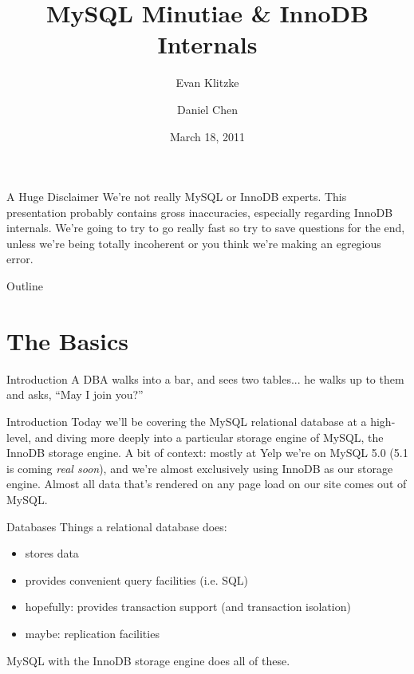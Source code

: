 \documentclass[14pt]{beamer}
\title{MySQL Minutiae \& InnoDB Internals}
\author{Evan Klitzke \and Daniel Chen}
\institute{Yelp, Inc.}
\date{March 18, 2011}
\newcommand{\myitem}{\item[\textbullet]}
\begin{document}
\begin{frame}
  \titlepage
\end{frame}

\begin{frame}{A Huge Disclaimer}
  We're not really MySQL or InnoDB experts.
  \newline
  \newline
  This presentation probably contains gross inaccuracies, especially regarding
  InnoDB internals.
  \newline
  \newline
  We're going to try to go really fast so try to save questions for the end,
  unless we're being totally incoherent or you think we're making an egregious
  error.
\end {frame}

\begin{frame}{Outline}
  \tableofcontents
\end{frame}

\section{The Basics}

\begin{frame}{Introduction}
  A DBA walks into a bar, and sees two tables...
  \pause
  \newline
  he walks up to them and asks, ``May I join you?''
\end {frame}

\begin{frame}{Introduction}
  Today we'll be covering the MySQL relational database at a high-level, and
  diving more deeply into a particular storage engine of MySQL, the InnoDB
  storage engine.
  \newline
  \newline
  A bit of context: mostly at Yelp we're on MySQL 5.0 (5.1 is coming \emph{real
    soon}), and we're almost exclusively using InnoDB as our storage
  engine. Almost all data that's rendered on any page load on our site comes out
  of MySQL.
\end {frame}

\begin{frame}{Databases}
  Things a relational database does:
  \begin{itemize}
    \myitem stores data
    \myitem provides convenient query facilities (i.e. SQL)
    \myitem hopefully: provides transaction support (and transaction isolation)
    \myitem maybe: replication facilities
  \end{itemize}
  MySQL with the InnoDB storage engine does all of these.
\end{frame}
\end{document}
